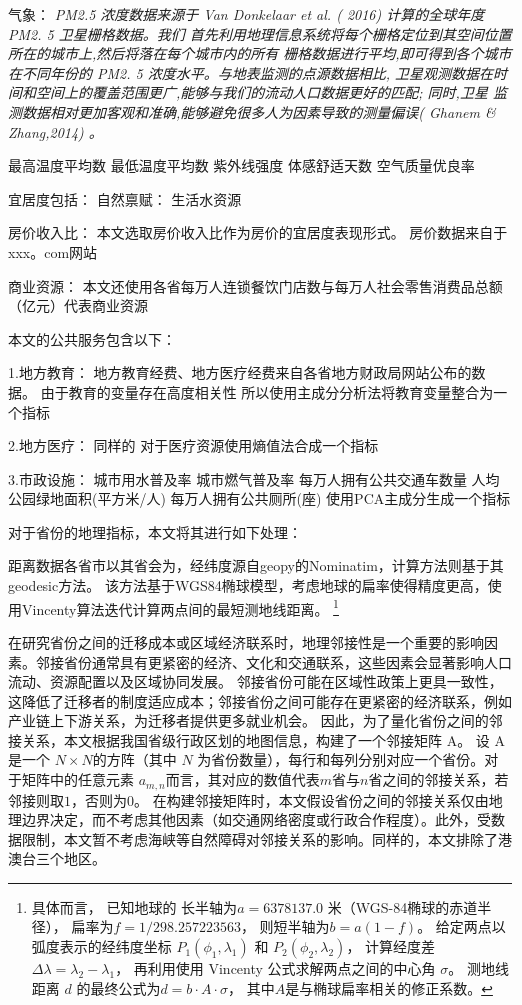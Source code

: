 \documentclass[a4paper,12pt,oneside, fontset=mac]{ctexbook} %
\begin{document}
气象：
\textit{PM2.5 浓度数据来源于 Van Donkelaar et al. ( 2016) 计算的全球年度 PM2. 5 卫星栅格数据。我们 首先利用地理信息系统将每个栅格定位到其空间位置所在的城市上,然后将落在每个城市内的所有 栅格数据进行平均,即可得到各个城市在不同年份的 PM2. 5 浓度水平。与地表监测的点源数据相比, 卫星观测数据在时间和空间上的覆盖范围更广,能够与我们的流动人口数据更好的匹配; 同时,卫星 监测数据相对更加客观和准确,能够避免很多人为因素导致的测量偏误( Ghanem \& Zhang,2014) 。}

最高温度平均数 最低温度平均数 紫外线强度 体感舒适天数  空气质量优良率



宜居度包括：
自然禀赋：
生活水资源


房价收入比：
本文选取房价收入比作为房价的宜居度表现形式。
房价数据来自于xxx。com网站

商业资源：
本文还使用各省每万人连锁餐饮门店数与每万人社会零售消费品总额（亿元）代表商业资源


本文的公共服务包含以下：

1.地方教育：
地方教育经费、地方医疗经费来自各省地方财政局网站公布的数据。
由于教育的变量存在高度相关性
所以使用主成分分析法将教育变量整合为一个指标

2.地方医疗：
同样的
对于医疗资源使用熵值法合成一个指标

3.市政设施：
城市用水普及率
城市燃气普及率
每万人拥有公共交通车数量
人均公园绿地面积(平方米/人)
每万人拥有公共厕所(座)
使用PCA主成分生成一个指标


对于省份的地理指标，本文将其进行如下处理：

距离数据各省市以其省会为，经纬度源自geopy的Nominatim，计算方法则基于其geodesic方法。
该方法基于WGS84椭球模型，考虑地球的扁率使得精度更高，使用Vincenty算法迭代计算两点间的最短测地线距离。
\footnote{
具体而言，
已知地球的
长半轴为$a = 6378137.0$ 米（WGS-84椭球的赤道半径），
扁率为$f = 1 / 298.257223563$，
则短半轴为$b = a(1 - f)$。
给定两点以弧度表示的经纬度坐标 $ P_1(\phi_1, \lambda_1) $ 和 $ P_2(\phi_2, \lambda_2) $，
计算经度差$\Delta\lambda = \lambda_2 - \lambda_1$，
再利用使用 Vincenty 公式求解两点之间的中心角 $\sigma$。
测地线距离 $d$ 的最终公式为$d = b \cdot A \cdot \sigma$，
其中$A$是与椭球扁率相关的修正系数。
}

在研究省份之间的迁移成本或区域经济联系时，地理邻接性是一个重要的影响因素。邻接省份通常具有更紧密的经济、文化和交通联系，这些因素会显著影响人口流动、资源配置以及区域协同发展。
邻接省份可能在区域性政策上更具一致性，这降低了迁移者的制度适应成本；邻接省份之间可能存在更紧密的经济联系，例如产业链上下游关系，为迁移者提供更多就业机会。
因此，为了量化省份之间的邻接关系，本文根据我国省级行政区划的地图信息，构建了一个邻接矩阵 A。
设 A 是一个 $N \times N$的方阵（其中 $N$ 为省份数量），每行和每列分别对应一个省份。对于矩阵中的任意元素 $a_{m,n}$而言，其对应的数值代表$m$省与$n$省之间的邻接关系，若邻接则取$1$，否则为$0$。
在构建邻接矩阵时，本文假设省份之间的邻接关系仅由地理边界决定，而不考虑其他因素（如交通网络密度或行政合作程度）。此外，受数据限制，本文暂不考虑海峡等自然障碍对邻接关系的影响。同样的，本文排除了港澳台三个地区。
\end{document}
